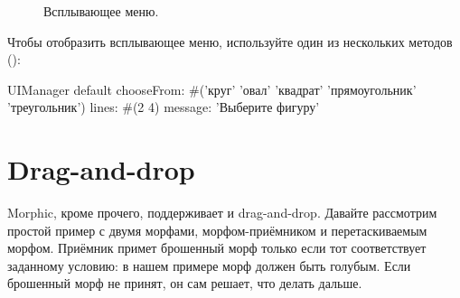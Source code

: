 \documentclass[a4paper,10pt,twoside]{book}
\begin{document}
\begin{figure}[htb]
\begin{minipage}{0.48\textwidth}
	\vfill
	\vspace{4ex}
	\caption{Всплывающее меню.}\figlabel{popup}
\end{minipage}
\end{figure}

Чтобы отобразить всплывающее меню, используйте один из нескольких методов  ():
\begin{code}{}
UIManager default
	chooseFrom: #('круг' 'овал' 'квадрат' 'прямоугольник' 'треугольник')
	lines: #(2 4) message: 'Выберите фигуру'
\end{code}





\section{Drag-and-drop}

Morphic, кроме прочего, поддерживает и drag-and-drop. Давайте рассмотрим простой пример с двумя морфами, морфом-приёмником и перетаскиваемым морфом.
Приёмник примет брошенный морф только если тот соответствует заданному условию: в нашем примере морф должен быть голубым. Если брошенный морф не принят, он сам решает, что делать дальше.
\end{document}
